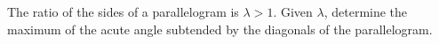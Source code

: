 The ratio of the sides of a parallelogram is $\lambda>1$. Given $\lambda$, determine the maximum of the acute angle subtended by the diagonals of the parallelogram.